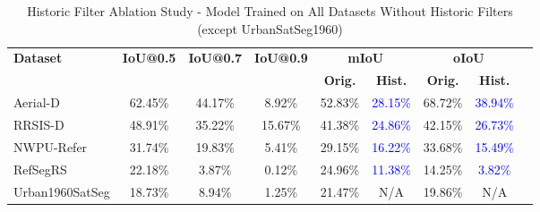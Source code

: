 \begin{table*}[t]
\centering
\caption{Historic Filter Ablation Study - Model Trained on All Datasets Without Historic Filters (except UrbanSatSeg1960)}
\label{tab:historic_ablation_results}
\begin{tabular}{@{}lcccccccc@{}}
\toprule
\textbf{Dataset} & \textbf{IoU@0.5} & \textbf{IoU@0.7} & \textbf{IoU@0.9} & \multicolumn{2}{c}{\textbf{mIoU}} & \multicolumn{2}{c}{\textbf{oIoU}} \\
\cmidrule(lr){5-6} \cmidrule(lr){7-8}
 & & & & \textbf{Orig.} & \textbf{Hist.} & \textbf{Orig.} & \textbf{Hist.} \\
\midrule
Aerial-D & 62.45\% & 44.17\% & 8.92\% & 52.83\% & \textcolor{blue}{28.15\%} & 68.72\% & \textcolor{blue}{38.94\%} \\
RRSIS-D & 48.91\% & 35.22\% & 15.67\% & 41.38\% & \textcolor{blue}{24.86\%} & 42.15\% & \textcolor{blue}{26.73\%} \\
NWPU-Refer & 31.74\% & 19.83\% & 5.41\% & 29.15\% & \textcolor{blue}{16.22\%} & 33.68\% & \textcolor{blue}{15.49\%} \\
RefSegRS & 22.18\% & 3.87\% & 0.12\% & 24.96\% & \textcolor{blue}{11.38\%} & 14.25\% & \textcolor{blue}{3.82\%} \\
Urban1960SatSeg & 18.73\% & 8.94\% & 1.25\% & 21.47\% & N/A & 19.86\% & N/A \\
\bottomrule
\end{tabular}
\end{table*}

